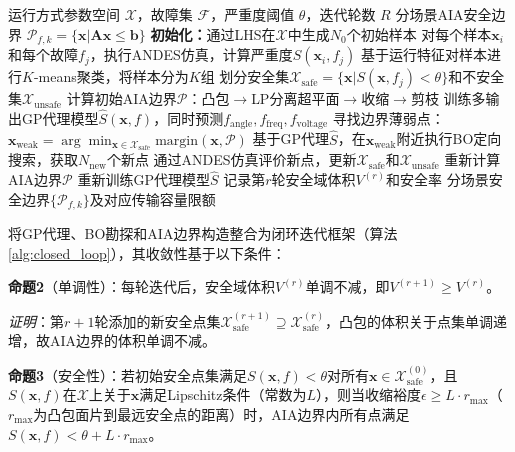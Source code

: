 \documentclass[a4paper,11pt]{ctexart}
\newcommand{\bx}{\mathbf{x}}
\begin{document}
\begin{algorithm}[htbp]
\caption{GP+BO+AIA闭环融合安全边界辨识算法}
\label{alg:closed_loop}
\begin{algorithmic}[1]
\REQUIRE 运行方式参数空间 $\mathcal{X}$，故障集 $\mathcal{F}$，严重度阈值 $\theta$，迭代轮数 $R$
\ENSURE 分场景AIA安全边界 $\mathcal{P}_{f,k} = \{\mathbf{x} | \mathbf{A}\mathbf{x} \leq \mathbf{b}\}$
\STATE \textbf{初始化：}通过LHS在$\mathcal{X}$中生成$N_0$个初始样本
\STATE 对每个样本$\mathbf{x}_i$和每个故障$f_j$，执行ANDES仿真，计算严重度$S(\mathbf{x}_i, f_j)$
\STATE 基于运行特征对样本进行$K$-means聚类，将样本分为$K$组
    \STATE 划分安全集$\mathcal{X}_{\text{safe}} = \{\mathbf{x} | S(\mathbf{x}, f_j) < \theta\}$和不安全集$\mathcal{X}_{\text{unsafe}}$
    \STATE 计算初始AIA边界$\mathcal{P}$：凸包$\to$LP分离超平面$\to$收缩$\to$剪枝
\ENDFOR
\STATE 训练多输出GP代理模型$\hat{S}(\mathbf{x}, f)$，同时预测$f_{\text{angle}}, f_{\text{freq}}, f_{\text{voltage}}$
        \STATE 寻找边界薄弱点：$\mathbf{x}_{\text{weak}} = \arg\min_{\mathbf{x} \in \mathcal{X}_{\text{safe}}} \text{margin}(\mathbf{x}, \mathcal{P})$
        \STATE 基于GP代理$\hat{S}$，在$\mathbf{x}_{\text{weak}}$附近执行BO定向搜索，获取$N_{\text{new}}$个新点
        \STATE 通过ANDES仿真评价新点，更新$\mathcal{X}_{\text{safe}}$和$\mathcal{X}_{\text{unsafe}}$
        \STATE 重新计算AIA边界$\mathcal{P}$
    \ENDFOR
    \STATE 重新训练GP代理模型$\hat{S}$
    \STATE 记录第$r$轮安全域体积$V^{(r)}$和安全率
\ENDFOR
\RETURN 分场景安全边界$\{\mathcal{P}_{f,k}\}$及对应传输容量限额
\end{algorithmic}
\end{algorithm}

将GP代理、BO勘探和AIA边界构造整合为闭环迭代框架（算法\ref{alg:closed_loop}），其收敛性基于以下条件：

\textbf{命题2}（单调性）：每轮迭代后，安全域体积$V^{(r)}$单调不减，即$V^{(r+1)} \geq V^{(r)}$。

\textit{证明}：第$r+1$轮添加的新安全点集$\mathcal{X}_{\text{safe}}^{(r+1)} \supseteq \mathcal{X}_{\text{safe}}^{(r)}$，凸包的体积关于点集单调递增\cite{boyd2004convex}，故AIA边界的体积单调不减。

\textbf{命题3}（安全性）：若初始安全点集满足$S(\bx, f) < \theta$对所有$\bx \in \mathcal{X}_{\text{safe}}^{(0)}$，且$S(\bx, f)$在$\mathcal{X}$上关于$\bx$满足Lipschitz条件（常数为$L$），则当收缩裕度$\epsilon \geq L \cdot r_{\max}$（$r_{\max}$为凸包面片到最远安全点的距离）时，AIA边界内所有点满足$S(\bx, f) < \theta + L \cdot r_{\max}$。
\end{document}
